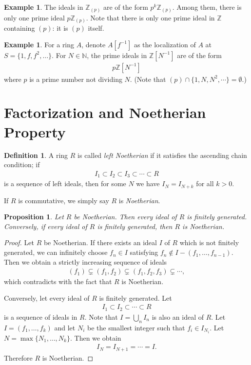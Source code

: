 \documentclass[12pt]{report}
\theoremstyle{plain}
\newtheorem{proposition}[theorem]{Proposition}
\theoremstyle{remark}
\theoremstyle{definition}
\newtheorem{definition}[theorem]{Definition}
\newtheorem{example}[theorem]{Example}
\newcommand{\N}{\mathbb{N}}
\newcommand{\Z}{\mathbb{Z}}
\begin{document}
\begin{example}
    The ideals in $\Z_{(p)}$ are of the form $p^k\Z_{(p)}$. Among them, there is only one prime ideal $p\Z_{(p)}$. Note that there is only one prime ideal in $\Z$ containing $(p)$: it is $(p)$ itself.
\end{example}

\begin{example}
    For a ring $A$, denote $A[f^{-1}]$ as the localization of $A$ at $S=\{1,f,f^2,\dots\}$. For $N\in \N$, the prime ideals in $\Z[N^{-1}]$ are of the form
    \begin{align*}
        p\Z[N^{-1}]
    \end{align*}
    where $p$ is a prime number not dividing $N$. (Note that $(p)\cap \{1,N,N^2,\cdots\}=\emptyset$.)
\end{example}


\clearpage
\section{Factorization and Noetherian Property}
\begin{definition}
    A ring $R$ is called \emph{left Noetherian} if it satisfies the ascending chain condition; if
    \begin{align*}
        I_1\subset I_2\subset I_3\subset\cdots\subset R
    \end{align*}
    is a sequence of left ideals, then for some $N$ we have $I_N=I_{N+k}$ for all $k>0$.

    If $R$ is commutative, we simply say $R$ is \emph{Noetherian}.
\end{definition}

\begin{proposition}
    Let $R$ be Noetherian. Then every ideal of $R$ is finitely generated. Conversely, if every ideal of $R$ is finitely generated, then $R$ is Noetherian.
\end{proposition}
\begin{proof}
    Let $R$ be Noetherian. If there exists an ideal $I$ of $R$ which is not finitely generated, we can infinitely choose $f_n\in I$ satisfying $f_n\notin I-(f_1,\dots,f_{n-1})$. Then we obtain a strictly increasing sequence of ideals
    \begin{align*}
        (f_1)\subsetneq (f_1,f_2) \subsetneq (f_1,f_2,f_3)\subsetneq \cdots,
    \end{align*}
    which contradicts with the fact that $R$ is Noetherian.

    Conversely, let every ideal of $R$ is finitely generated. Let
    \begin{align*}
        I_1\subset I_2\subset\cdots\subset R
    \end{align*}
    is a sequence of ideals in $R$. Note that $I=\bigcup_n I_n$ is also an ideal of $R$. Let $I=(f_1,\dots,f_k)$ and let $N_i$ be the smallest integer such that $f_i\in I_{N_i}$. Let $N=\max\{N_1,\dots,N_k\}$. Then we obtain
    \begin{align*}
        I_N=I_{N+1}=\cdots=I.
    \end{align*}
    Therefore $R$ is Noetherian.
\end{proof}
\end{document}
